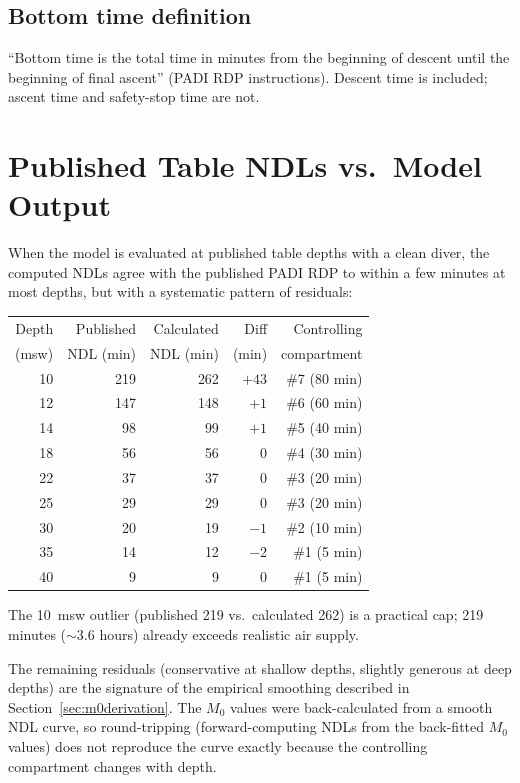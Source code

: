 \documentclass[11pt,letterpaper]{article}
\begin{document}
\subsection{Bottom time definition}

``Bottom time is the total time in minutes from the beginning of descent
until the beginning of final ascent'' (PADI RDP instructions).  Descent
time is included; ascent time and safety-stop time are not.


\section{Published Table NDLs vs.\ Model Output}

When the model is evaluated at published table depths with a clean diver,
the computed NDLs agree with the published PADI RDP to within a few
minutes at most depths, but with a systematic pattern of residuals:

\begin{center}
\begin{tabular}{@{}rrrrr@{}}
\toprule
Depth & Published & Calculated & Diff & Controlling \\
(msw) & NDL (min) & NDL (min) & (min) & compartment \\
\midrule
10 & 219 & 262 & $+43$ & \#7 (80 min) \\
12 & 147 & 148 & $+1$  & \#6 (60 min) \\
14 &  98 &  99 & $+1$  & \#5 (40 min) \\
18 &  56 &  56 & $\phantom{+}0$ & \#4 (30 min) \\
22 &  37 &  37 & $\phantom{+}0$ & \#3 (20 min) \\
25 &  29 &  29 & $\phantom{+}0$ & \#3 (20 min) \\
30 &  20 &  19 & $-1$  & \#2 (10 min) \\
35 &  14 &  12 & $-2$  & \#1 (5 min)  \\
40 &   9 &   9 & $\phantom{+}0$ & \#1 (5 min)  \\
\bottomrule
\end{tabular}
\end{center}

The 10~msw outlier (published 219 vs.\ calculated 262) is a practical cap;
219 minutes ($\sim\!3.6$ hours) already exceeds realistic air supply.

The remaining residuals (conservative at shallow depths, slightly generous
at deep depths) are the signature of the empirical smoothing described in
Section~\ref{sec:m0derivation}.  The $M_0$ values were back-calculated
from a smooth NDL curve, so round-tripping (forward-computing NDLs from
the back-fitted $M_0$ values) does not reproduce the curve exactly because
the controlling compartment changes with depth.
\end{document}
